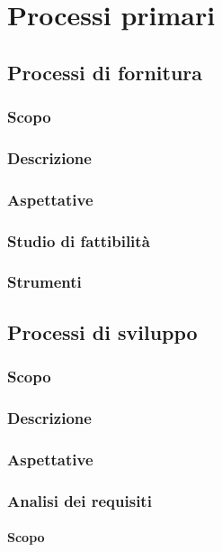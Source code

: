 \section{Processi primari}


\subsection{Processi di fornitura}
\subsubsection{Scopo}
\subsubsection{Descrizione}
\subsubsection{Aspettative}
\subsubsection{Studio di fattibilità}
\subsubsection{Strumenti}




\subsection{Processi di sviluppo}
\subsubsection{Scopo}
\subsubsection{Descrizione}
\subsubsection{Aspettative}

\subsubsection{Analisi dei requisiti}
\paragraph{Scopo}
